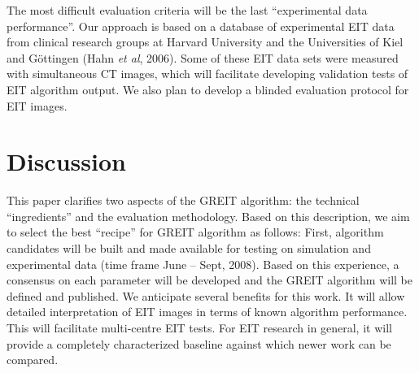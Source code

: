 \documentclass[letterpaper,twocolumn,10pt]{article}
\newcommand{\etal}{{\em et al}}
\begin{document}
The most difficult evaluation criteria will be the 
last ``experimental data performance''. Our approach
is based on a database of experimental
EIT data from clinical research groups at Harvard University
and the Universities
of Kiel and G\"ottingen (Hahn \etal, 
2006). Some of these EIT data sets were measured with
simultaneous CT images, which will facilitate developing
validation tests of EIT algorithm output. We also
plan to develop a blinded evaluation protocol for
EIT images.


\section{Discussion}

This paper clarifies two aspects of the
GREIT algorithm: the technical ``ingredients''
and the evaluation methodology. Based on
this description, we aim to select the best
``recipe'' for GREIT algorithm as follows:
First, algorithm candidates will be
built and made available for testing on
simulation and experimental data
(time frame June -- Sept, 2008). 
Based on this experience, a consensus
on each parameter will be developed
and the GREIT algorithm will be
defined and published.
We anticipate several benefits for
this work. It will allow detailed
interpretation of EIT images in terms of
known algorithm performance. This will facilitate
multi-centre EIT tests. For EIT research in
general, it will provide a completely characterized
baseline against which newer work can be compared.
\end{document}
